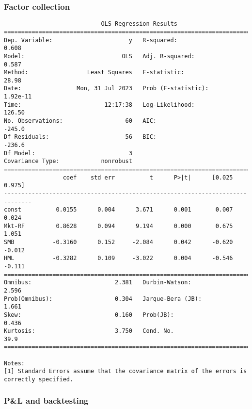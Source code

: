 \documentclass[11pt]{article}
\begin{document}
\subsubsection{Factor collection}
\label{sec:org08cce20}
\begin{verbatim}
                            OLS Regression Results                            
==============================================================================
Dep. Variable:                      y   R-squared:                       0.608
Model:                            OLS   Adj. R-squared:                  0.587
Method:                 Least Squares   F-statistic:                     28.98
Date:                Mon, 31 Jul 2023   Prob (F-statistic):           1.92e-11
Time:                        12:17:38   Log-Likelihood:                 126.50
No. Observations:                  60   AIC:                            -245.0
Df Residuals:                      56   BIC:                            -236.6
Df Model:                           3                                         
Covariance Type:            nonrobust                                         
==============================================================================
                 coef    std err          t      P>|t|      [0.025      0.975]
------------------------------------------------------------------------------
const          0.0155      0.004      3.671      0.001       0.007       0.024
Mkt-RF         0.8628      0.094      9.194      0.000       0.675       1.051
SMB           -0.3160      0.152     -2.084      0.042      -0.620      -0.012
HML           -0.3282      0.109     -3.022      0.004      -0.546      -0.111
==============================================================================
Omnibus:                        2.381   Durbin-Watson:                   2.596
Prob(Omnibus):                  0.304   Jarque-Bera (JB):                1.661
Skew:                           0.160   Prob(JB):                        0.436
Kurtosis:                       3.750   Cond. No.                         39.9
==============================================================================

Notes:
[1] Standard Errors assume that the covariance matrix of the errors is correctly specified.
\end{verbatim}

\subsubsection{P\&L and backtesting}
\label{sec:orgf9ea864}
\end{document}
